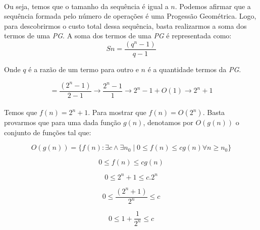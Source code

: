 \documentclass[a4paper, 12pt]{article}
\begin{document}
 \\

Ou seja, temos que o tamanho da sequência é igual a $n$. Podemos afirmar que a sequência formada pelo número de operações é uma Progessão Geométrica. Logo, para descobrirmos o custo total dessa sequência, basta realizarmos a soma dos termos de uma {\it PG}. A soma dos termos de uma {\it PG} é representada como:
\begin{equation}
Sn = \dfrac{(q^{n}-1)}{q-1}
\end{equation}

Onde $q$ é a razão de um termo para outro e $n$ é a quantidade termos da {\it PG}.

\begin{equation}
= \dfrac{(2^{n}-1)}{2-1} \rightarrow \dfrac{2^{n}-1}{1} \rightarrow 2^{n}-1 + O(1) \rightarrow 2^{n}+1
\end{equation}\\

Temos que $f(n)=2^n+1$. Para mostrar que $f(n)=O(2^n)$. Basta provarmos que para uma dada função $g(n)$, denotamos por $O(g(n))$ o conjunto de funções
tal que: 

\begin{equation}
O(g(n)) = \{f(n) : \exists c \wedge \exists n_0 \mid 0 \leq f(n) \leq cg(n) \forall n \geq n_0 \}
\end{equation}

\begin{equation}
0 \leq f(n) \leq cg(n)
\end{equation}

\begin{equation}
0 \leq 2^n+1 \leq c.2^n
\end{equation}

\begin{equation}
0 \leq \frac{(2^n+1)}{2^n} \leq c
\end{equation}

\begin{equation}
0 \leq 1+\frac{1}{2^n} \leq c
\end{equation}\\
\end{document}
